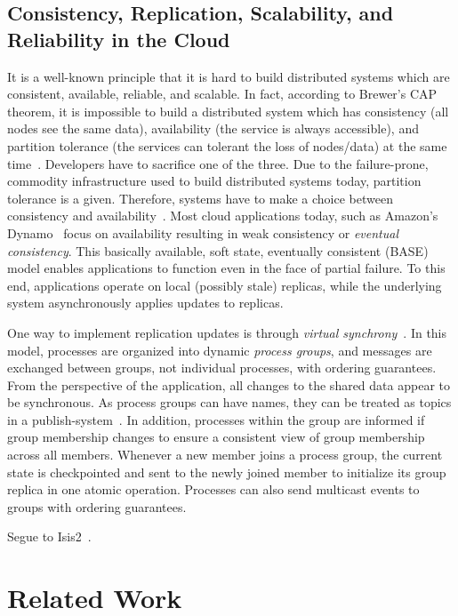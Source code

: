 \documentclass[a4paper,12pt,twoside,openright]{report}
\begin{document}
\section{Consistency, Replication, Scalability, and Reliability in the
Cloud}\label{chapter:background:section:consistency}
It is a well-known principle that it is hard to build distributed systems which
are consistent, available, reliable, and scalable. In fact, according to
Brewer's CAP theorem, it is impossible to build a distributed system which has
consistency (all nodes see the same data), availability (the service is always
accessible), and partition tolerance (the services can tolerant the loss of
nodes/data) at the same time~\cite{Brewer:2000:TRD,Gilbert:2002:BCF}. Developers
have to sacrifice one of the three. Due to the failure-prone, commodity
infrastructure used to build distributed systems today, partition tolerance is a
given. Therefore, systems have to make a choice between consistency and
availability~\cite{Vogels:2009:EC}. Most cloud applications today, such as
Amazon's Dynamo~\cite{DeCandia:2007:DAH} focus on availability resulting in weak
consistency or \emph{eventual consistency}. This basically available, soft
state, eventually consistent (BASE)~\cite{Pritchett:2008:BAA} model enables
applications to function even in the face of partial failure. To this end,
applications operate on local (possibly stale) replicas, while the underlying
system asynchronously applies updates to replicas.

One way to implement replication updates is through \emph{virtual
synchrony}~\cite{Birman:1987:EVS}. In this model, processes are organized into
dynamic \emph{process groups}, and messages are exchanged between groups, not
individual processes, with ordering guarantees. From the perspective of the
application, all changes to the shared data appear to be synchronous. As process
groups can have names, they can be treated as topics in a
publish-system~\cite{Birman:2010:AHO}. In addition, processes within the group
are informed if group membership changes to ensure a consistent view of group
membership across all members. Whenever a new member joins a process group, the
current state is checkpointed and sent to the newly joined member to initialize
its group replica in one atomic operation. Processes can also send multicast
events to groups with ordering guarantees.

Segue to Isis2~\cite{Birman:2012:OCW}.

\chapter{Related Work}\label{chapter:relatedWork}
\end{document}
